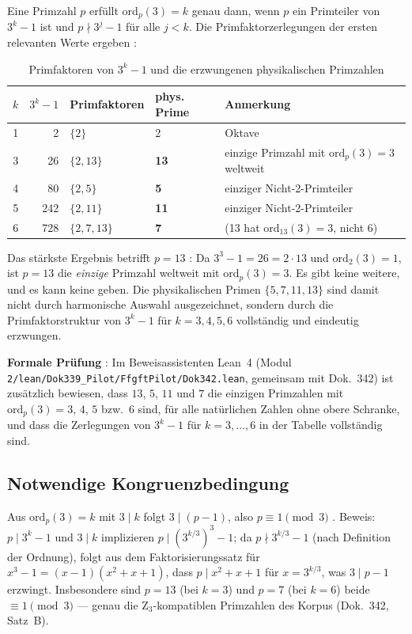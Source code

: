 Eine Primzahl $p$ erfüllt $\mathrm{ord}_p(3) = k$ genau dann, wenn $p$
ein Primteiler von $3^k - 1$ ist und $p \nmid 3^j - 1$ für alle $j < k$.
Die Primfaktorzerlegungen der ersten relevanten Werte ergeben \BM:

\begin{table}[H]
\centering
\caption{Primfaktoren von $3^k - 1$ und die erzwungenen physikalischen Primzahlen}
\begin{tabular}{rrlll}
\toprule
$k$ & $3^k - 1$ & Primfaktoren & phys. Prime & Anmerkung \\
\midrule
1 & 2 & $\{2\}$ & 2 & Oktave \\
3 & 26 & $\{2, 13\}$ & \textbf{13} & einzige Primzahl mit $\mathrm{ord}_p(3)=3$ weltweit \\
4 & 80 & $\{2, 5\}$ & \textbf{5} & einziger Nicht-2-Primteiler \\
5 & 242 & $\{2, 11\}$ & \textbf{11} & einziger Nicht-2-Primteiler \\
6 & 728 & $\{2, 7, 13\}$ & \textbf{7} & (13 hat $\mathrm{ord}_{13}(3)=3$, nicht 6) \\
\bottomrule
\end{tabular}
\end{table}

Das stärkste Ergebnis betrifft $p = 13$ \BM: Da $3^3 - 1 = 26 = 2 \cdot 13$
und $\mathrm{ord}_2(3) = 1$, ist $p = 13$ die \emph{einzige} Primzahl
weltweit mit $\mathrm{ord}_p(3) = 3$. Es gibt keine weitere, und es kann keine
geben. Die physikalischen Primen $\{5, 7, 11, 13\}$ sind damit nicht durch
harmonische Auswahl ausgezeichnet, sondern durch die Primfaktorstruktur von
$3^k - 1$ für $k = 3, 4, 5, 6$ vollständig und eindeutig erzwungen.

\noindent\textbf{Formale Prüfung} \LM: Im Beweisassistenten Lean~4 (Modul
\texttt{2/\allowbreak lean/\allowbreak Dok339\_Pilot/\allowbreak FfgftPilot/\allowbreak Dok342.lean}, gemeinsam mit Dok.~342)
ist zusätzlich bewiesen, dass $13$, $5$, $11$ und $7$ die einzigen Primzahlen
mit $\mathrm{ord}_p(3)=3$, $4$, $5$ bzw.\ $6$ sind, für alle natürlichen Zahlen
ohne obere Schranke, und dass die Zerlegungen von $3^k-1$ für $k=3,\dots,6$ in
der Tabelle vollständig sind.

\subsection{Notwendige Kongruenzbedingung}

Aus $\mathrm{ord}_p(3) = k$ mit $3 \mid k$ folgt $3 \mid (p-1)$,
also $p \equiv 1 \pmod{3}$ \BM. Beweis: $p \mid 3^k - 1$ und $3 \mid k$
implizieren $p \mid (3^{k/3})^3 - 1$; da $p \nmid 3^{k/3} - 1$ (nach
Definition der Ordnung), folgt aus dem Faktorisierungssatz für
$x^3 - 1 = (x-1)(x^2+x+1)$, dass $p \mid x^2 + x + 1$ für $x = 3^{k/3}$,
was $3 \mid p - 1$ erzwingt. Insbesondere sind $p = 13$ (bei $k=3$) und
$p = 7$ (bei $k=6$) beide $\equiv 1 \pmod{3}$ — genau die Z$_3$-kompatiblen
Primzahlen des Korpus (Dok.~342, Satz~B).

